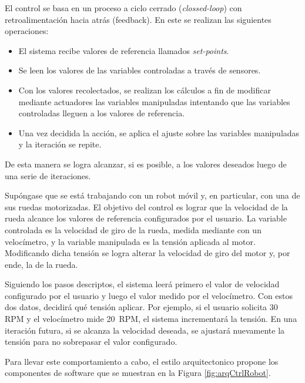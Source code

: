 El control se basa en un proceso a ciclo cerrado (\textit{clossed-loop}) con retroalimentación hacia atrás (feedback). En este se realizan las siguientes operaciones:
\begin{itemize}
\item El sistema recibe valores de referencia llamados \textit{set-points}.
\item Se leen los valores de las variables controladas a través de sensores.
\item Con los valores recolectados, se realizan los cálculos a fin de modificar mediante actuadores las variables manipuladas intentando que las variables controladas lleguen a los valores de referencia.
\item Una vez decidida la acción, se aplica el ajuste sobre las variables manipuladas y la iteración se repite.
\end{itemize}

De esta manera se logra alcanzar, si es posible, a los valores deseados luego de una serie de iteraciones.

Supóngase que se está trabajando con un robot móvil y, en particular, con una de sus ruedas motorizadas. El objetivo del control es lograr que la velocidad de la rueda alcance los valores de referencia configurados por el usuario. La variable controlada es la velocidad de giro de la rueda, medida mediante con un velocímetro, y la variable manipulada es la tensión aplicada al motor. Modificando dicha tensión se logra alterar la velocidad de giro del motor y, por ende, la de la rueda.

Siguiendo los pasos descriptos, el sistema leerá primero el valor de velocidad configurado por el usuario y luego el valor medido por el velocímetro. Con estos dos datos, decidirá qué tensión aplicar. Por ejemplo, si el usuario solicita 30  \gls{RPM} y el velocímetro mide 20  \gls{RPM}, el sistema incrementará la tensión. En una iteración futura, si se alcanza la velocidad deseada, se ajustará nuevamente la tensión para no sobrepasar el valor configurado.

Para llevar este comportamiento a cabo, el estilo arquitectonico propone los componentes de software que se muestran en la Figura \ref{fig:arqCtrlRobot}.


